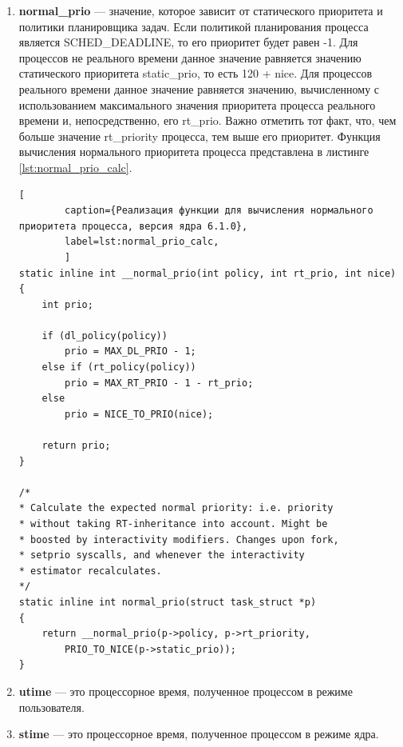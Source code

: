 \begin{enumerate}[label*=\arabic*.]
\begin{lstlisting}[
		caption={Реализация функции для изменения значений nice и static\_prio процесса, версия ядра 6.1.0},
		label=lst:static_prio_calc,
		]
	p->static_prio = NICE_TO_PRIO(nice);
	set_load_weight(p, true);
	old_prio = p->prio;
	p->prio = effective_prio(p);
	
	if (queued)
		enqueue_task(rq, p, ENQUEUE_RESTORE | ENQUEUE_NOCLOCK);
	if (running)
		set_next_task(rq, p);
	
	/*
	* If the task increased its priority or is running and
	* lowered its priority, then reschedule its CPU:
	*/
	p->sched_class->prio_changed(rq, p, old_prio);
	
out_unlock:
	task_rq_unlock(rq, p, &rf);
}
	\end{lstlisting}

	\item \textbf{normal\_prio} --- значение, которое зависит от статического приоритета и политики планировщика задач. Если политикой планирования процесса является SCHED\_DEADLINE, то его приоритет будет равен -1. Для процессов не реального времени данное значение равняется значению статического приоритета static\_prio, то есть 120 + nice. Для процессов реального времени данное значение равняется значению, вычисленному с использованием максимального значения приоритета процесса реального времени и, непосредственно, его rt\_prio. Важно отметить тот факт, что, чем больше значение rt\_priority процесса, тем выше его приоритет. Функция вычисления нормального приоритета процесса представлена в листинге \ref{lst:normal_prio_calc}. \cite{prio_calc}
	
	\begin{lstlisting}[
		caption={Реализация функции для вычисления нормального приоритета процесса, версия ядра 6.1.0},
		label=lst:normal_prio_calc,
		]
static inline int __normal_prio(int policy, int rt_prio, int nice)
{
	int prio;
	
	if (dl_policy(policy))
		prio = MAX_DL_PRIO - 1;
	else if (rt_policy(policy))
		prio = MAX_RT_PRIO - 1 - rt_prio;
	else
		prio = NICE_TO_PRIO(nice);
	
	return prio;
}

/*
* Calculate the expected normal priority: i.e. priority
* without taking RT-inheritance into account. Might be
* boosted by interactivity modifiers. Changes upon fork,
* setprio syscalls, and whenever the interactivity
* estimator recalculates.
*/
static inline int normal_prio(struct task_struct *p)
{
	return __normal_prio(p->policy, p->rt_priority, 
		PRIO_TO_NICE(p->static_prio));
}
	\end{lstlisting}
	
	\item \textbf{utime} --- это процессорное время, полученное процессом в режиме пользователя.
	\item \textbf{stime} --- это процессорное время, полученное процессом в режиме ядра.
\end{enumerate}



